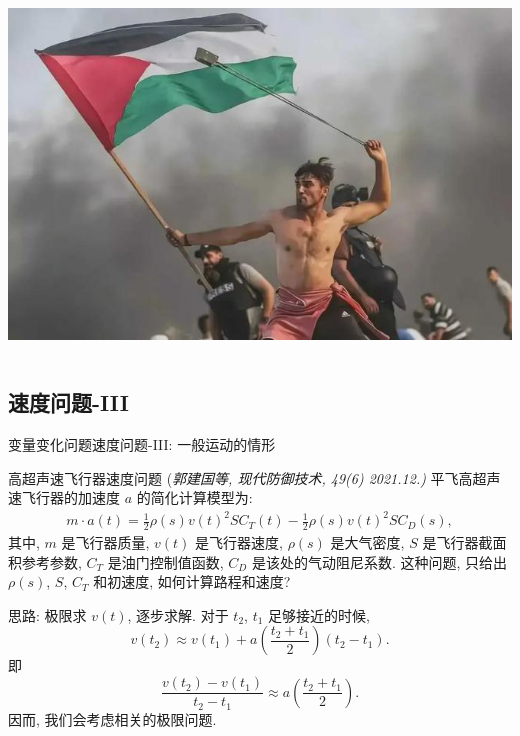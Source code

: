 \documentclass[
10pt,
aspectratio=43,
]{beamer}
\begin{document}
\begin{frame}
\begin{columns}
		\includegraphics[width=\textwidth]{sling.jpeg}
	\end{columns}

\end{frame}


\subsection{速度问题-III}
\begin{frame}{变量变化问题}{速度问题-III: 一般运动的情形}
	\begin{exampleblock}{高超声速飞行器速度问题 \color{blue}(\small{\it 郭建国等, {现代防御技术}, 49(6) 2021.12.)}}
		平飞高超声速飞行器的加速度 $a$ 的简化计算模型为:
		\begin{align*}
			m\cdot a(t)= \frac{1}{2}\rho(s) v(t)^2 S C_T(t) - \frac{1}{2}\rho(s) v(t)^2 S C_D(s),
		\end{align*}
		其中, $m$ 是飞行器质量, $v(t)$ 是飞行器速度, $\rho(s)$ 是大气密度, $S$ 是飞行器截面积参考参数, $C_T$ 是油门控制值函数, $C_D$ 是该处的气动阻尼系数. 这种问题, 只给出$\rho(s)$, $S$, $C_T$ 和初速度, 如何计算路程和速度?
	\end{exampleblock}
	思路: 极限求 $v(t)$, 逐步求解. 对于 $t_2$, $t_1$ 足够接近的时候,
	\[
		v(t_2)\approx v(t_1)+a\left(\frac{t_2+t_1}{2}\right)(t_2-t_1).
	\]
	即
	\[
		\frac{v(t_2)-v(t_1)}{t_2-t_1}\approx a\left(\frac{t_2+t_1}{2}\right).
	\]
	因而, 我们会考虑相关的极限问题.
\end{frame}
\end{document}
